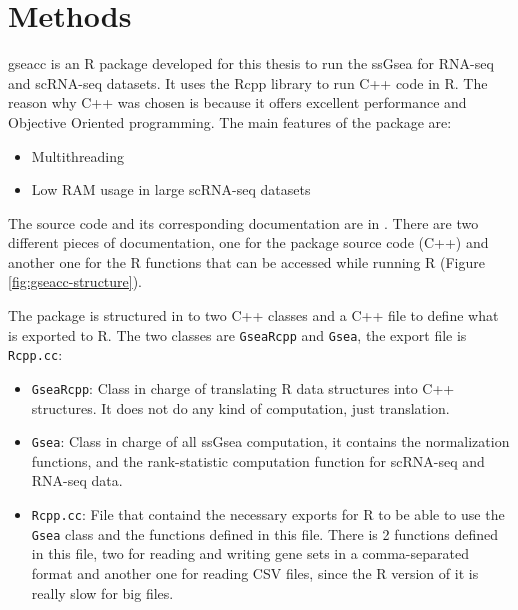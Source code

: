 \documentclass[aps,prb,twocolumn,superscriptaddress,floatfix,longbibliography]{revtex4-2}
\newif\ifptitle
\newif\ifpnumber
\newcounter{para}
\newcommand\ptitle[1]{\par\refstepcounter{para}
{\ifpnumber{\noindent\textcolor{lightgray}{\textbf{\thepara}}\indent}\fi}
{\ifptitle{\textbf{[{#1}]}}\fi}}
\begin{document}
\section{\label{sec:LaTeX} Methods}

\ptitle{gseacc} gseacc is an R package developed for this thesis to run the ssGsea for RNA-seq and scRNA-seq datasets.  It uses the Rcpp library to run C++ code in R. The reason why C++ was chosen is because it offers excellent performance and Objective Oriented programming. The main features of the package are:
\begin{itemize}
 \item Multithreading
 \item Low RAM usage in large scRNA-seq datasets
\end{itemize}

The source code and its corresponding documentation are in \cite{gseacc-github}. There are two different pieces of documentation, one for the package source code (C++) and another one for the R functions that can be accessed while running R (Figure \ref{fig:gseacc-structure}).

The package is structured in to two C++ classes and a C++ file to define what is exported to R. The two classes are \texttt{GseaRcpp} and \texttt{Gsea}, the export file is \texttt{Rcpp.cc}:
\begin{itemize}
 \item \texttt{GseaRcpp}: Class in charge of translating R data structures into C++ structures. It does not do any kind of computation, just translation.
 \item \texttt{Gsea}: Class in charge of all ssGsea computation, it contains the normalization functions, and the rank-statistic computation function for scRNA-seq and RNA-seq data.
 \item \texttt{Rcpp.cc}: File that containd the necessary exports for R to be able to use the \texttt{Gsea} class and the functions defined in this file. There is 2 functions defined in this file, two for reading and writing gene sets in a comma-separated format and another one for reading CSV files, since the R version of it is really slow for big files.
\end{itemize}
\end{document}
